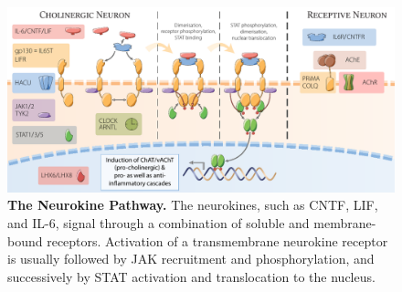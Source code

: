
\begin{figure}
\includegraphics[width=\textwidth]{figures/neurokine-no-mir}
\caption[The Neurokine Pathway.]{\textbf{The Neurokine Pathway.} The neurokines, such as CNTF, LIF, and IL-6, signal through a combination of soluble and membrane-bound receptors. Activation of a transmembrane neurokine receptor is usually followed by JAK recruitment and phosphorylation, and successively by STAT activation and translocation to the nucleus.
\label{fig:neurokine-no-mir}}
\end{figure}


